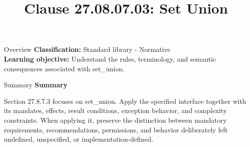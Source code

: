 \documentclass[10pt,letterpaper]{article}
\title{Clause 27.08.07.03: Set Union}
\author{}
\date{}
\begin{document}
\maketitle
\begin{CornellOverviewBox}{Overview}
\textbf{Classification:} Standard library - Normative\\[2pt]
\textbf{Learning objective:} Understand the rules, terminology, and semantic consequences associated with set\_union.
\end{CornellOverviewBox}\begin{CornellSummaryBox}{Summary}
{\sffamily\bfseries\color{Accent} Summary}\par\vspace{3pt}Section 27.8.7.3 focuses on set\_union. Apply the specified interface together with its mandates, effects, result conditions, exception behavior, and complexity constraints. When applying it, preserve the distinction between mandatory requirements, recommendations, permissions, and behavior deliberately left undefined, unspecified, or implementation-defined.
\end{CornellSummaryBox}
\end{document}
